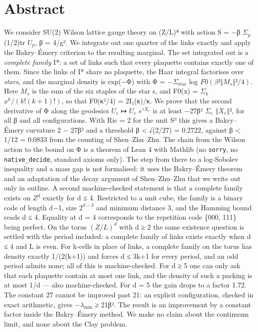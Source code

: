 \documentclass[11pt,a4paper]{article}
\theoremstyle{named}
\begin{document}
\section*{Abstract}
We consider SU(2) Wilson lattice gauge theory on (Z/L)⁴ with action S = −β $Σ_p$ (1/2)tr $U_p$, β = 4/g². We integrate out one quarter of the links exactly and apply the Bakry–Émery criterion to the resulting marginal. The set integrated out is a \textit{complete family} I*: a set of links such that every plaquette contains exactly one of them. Since the links of I* share no plaquette, the Haar integral factorises over \textit{stars}, and the marginal density is exp(−Φ) with Φ = $−Σ_{\mathrm{star}}$ log $F0(β²‖M_s‖²/4)$. Here $M_s$ is the sum of the six staples of the star s, and F0(x) = $Σ_k$ $x^k/(k!(k+1)!)$, so that F0(κ²/4) = 2I₁(κ)/κ. We prove that the second derivative of Φ along the geodesics $U_e$ ↦ $U_e$ $e^{τX_e}$ is at least −27β² $Σ_e$ $‖X_e‖²$, for all β and all configurations. With Ric = 2 for the unit S³ this gives a Bakry–Émery curvature 2 − 27β² and a threshold β \textless{} √(2/27) = 0.2722, against β \textless{} 1/12 = 0.0833 from the counting of Shen–Zhu–Zhu. The chain from the Wilson action to the bound on Φ is a theorem of Lean 4 with Mathlib (no \texttt{sorry}, no \texttt{native\_\allowbreak{}decide}, standard axioms only). The step from there to a log-Sobolev inequality and a mass gap is not formalised: it uses the Bakry–Émery theorem and an adaptation of the decay argument of Shen–Zhu–Zhu that we write out only in outline. A second machine-checked statement is that a complete family exists on $Z^d$ exactly for d ≤ 4. Restricted to a unit cube, the family is a binary code of length d−1, size $2^{d−3}$ and minimum distance 3, and the Hamming bound reads d ≤ 4. Equality at d = 4 corresponds to the repetition code \{000, 111\} being perfect. On the torus $(Z/L)^d$ with d ≥ 2 the same existence question is settled with the period included: a complete family of links exists exactly when d ≤ 4 and L is even. For k-cells in place of links, a complete family on the torus has density exactly 1/(2(k+1)) and forces d ≤ 3k+1 for every period, and an odd period admits none; all of this is machine-checked. For d ≥ 5 one can only ask that each plaquette contain at most one link, and the density of such a packing is at most 1/d — also machine-checked. For d = 5 the gain drops to a factor 1.72. The constant 27 cannot be improved past 21: an explicit configuration, checked in exact arithmetic, gives $−λ_{\min}$ ≥ 21β². The result is an improvement by a constant factor inside the Bakry–Émery method. We make no claim about the continuum limit, and none about the Clay problem.
\end{document}
